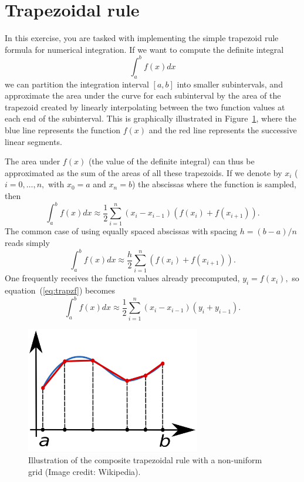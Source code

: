 
\section{Trapezoidal rule}

In this exercise, you are tasked with implementing the simple trapezoid
rule formula for numerical integration. If we want to compute the
definite integral \begin{equation}
\int_{a}^{b}f(x)dx\end{equation}
we can partition the integration interval $[a,b]$ into smaller subintervals,
and approximate the area under the curve for each subinterval by the
area of the trapezoid created by linearly interpolating between the
two function values at each end of the subinterval. This is graphically
illustrated in Figure~\ref{fig:trapezoid}, where the blue line represents
the function $f(x)$ and the red line represents the successive linear
segments.

The area under $f(x)$ (the value of the definite integral) can thus
be approximated as the sum of the areas of all these trapezoids. If
we denote by $x_{i}$ ($i=0,\ldots,n,$ with $x_{0}=a$ and $x_{n}=b$)
the abscissas where the function is sampled, then \begin{equation}
\int_{a}^{b}f(x)dx\approx\frac{1}{2}\sum_{i=1}^{n}\left(x_{i}-x_{i-1}\right)\left(f(x_{i})+f(x_{i+1})\right).\label{eq:trapzf}\end{equation}
The common case of using equally spaced abscissas with spacing $h=(b-a)/n$
reads simply \begin{equation}
\int_{a}^{b}f(x)dx\approx\frac{h}{2}\sum_{i=1}^{n}\left(f(x_{i})+f(x_{i+1})\right).\label{eq:trapzf2}\end{equation}
One frequently receives the function values already precomputed, $y_{i}=f(x_{i}),$
so equation~(\ref{eq:trapzf}) becomes \begin{equation}
\int_{a}^{b}f(x)dx\approx\frac{1}{2}\sum_{i=1}^{n}\left(x_{i}-x_{i-1}\right)\left(y_{i}+y_{i-1}\right).\label{eq:trapz}\end{equation}


%
\begin{figure}
\begin{centering}\includegraphics[width=3in]{fig/Composite_trapezoidal_rule_illustration}\par\end{centering}


\caption{\label{fig:trapezoid}Illustration of the composite trapezoidal rule
with a non-uniform grid (Image credit: Wikipedia).}
\end{figure}


